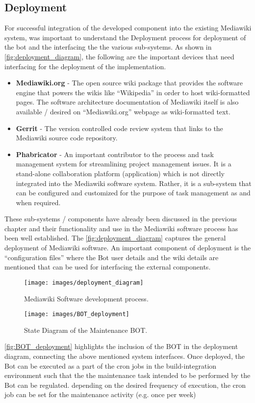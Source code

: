 \subsection{Deployment}
For successful integration of the developed component into the existing Mediawiki system, was important to understand the Deployment process for deployment of the bot and the interfacing the the various sub-systems. As shown in \autoref{fig:deployment_diagram}, the following are the important devices that need interfacing for the deployment of the implementation.  
\begin{itemize}
\item \textbf{Mediawiki.org} \cite{mediawiki} - The open source wiki package that provides the software engine that powers the wikis like \enquote{Wikipedia} in order to host wiki-formatted pages. The software architecture documentation of Mediawiki itself is also available / desired on \enquote{Mediawiki.org} webpage as wiki-formatted text.
\item \textbf{Gerrit} \cite{gerrit} - The version controlled code review system that links to the Mediawiki source code repository.
\item \textbf{Phabricator} \cite{wm-phab} - An important contributor to the process and task management system for streamlining project management issues. It is a stand-alone collaboration platform (application) which is not directly integrated into the Mediawiki software system. Rather, it is a sub-system that can be configured and customized for the purpose of task management as and when required.
\end{itemize}

These sub-systems / components have already been discussed in the previous chapter and their functionality and use in the Mediawiki software process has been well established. The \autoref{fig:deployment_diagram} captures the general deployment of Mediawiki software. An important component of deployment is the \enquote{configuration files} where the Bot user details and the wiki details are mentioned that can be used for interfacing the external components.
\begin{figure}[H]
  \centering
  \texttt{[image: images/deployment\_diagram]}
  \caption[Mediawiki Software development process]{Mediawiki Software development process.}\label{fig:deployment_diagram}
\end{figure} 
\begin{figure}[H]
  \centering
  \texttt{[image: images/BOT\_deployment]}
  \caption[State Diagram of the Maintenance BOT]{State Diagram of the Maintenance BOT.}\label{fig:BOT_deployment}
\end{figure}
\autoref{fig:BOT_deployment} highlights the inclusion of the BOT in the deployment diagram, connecting the above mentioned system interfaces.
\newline Once deployed, the Bot can be executed as a part of the cron jobs in the build-integration environment such that the the maintenance task intended to be performed by the Bot can be regulated. depending on the desired frequency of execution, the cron job can be set for the maintenance activity (e.g. once per week)


